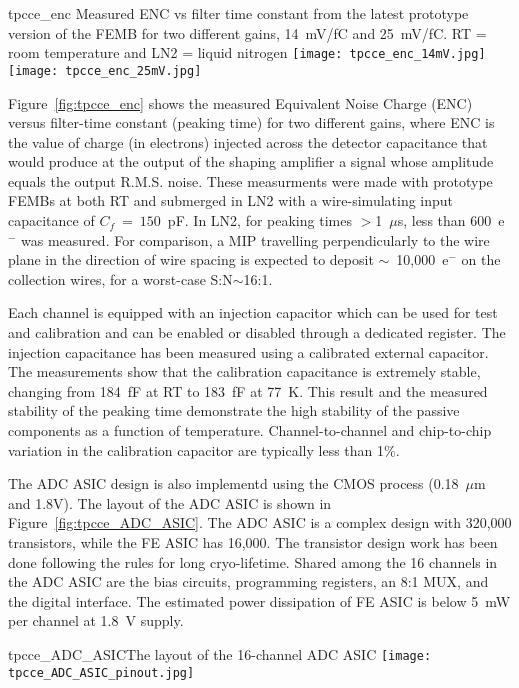 \begin{cdrfigure}{tpcce_enc}{
Measured ENC vs filter time constant from the latest prototype version of the FEMB
for two different gains, 14~mV/fC and 25~mV/fC. RT = room temperature and 
LN2 = liquid nitrogen}
\texttt{[image: tpcce\_enc\_14mV.jpg]}
\texttt{[image: tpcce\_enc\_25mV.jpg]}
\end{cdrfigure}

Figure~\ref{fig:tpcce_enc} shows the measured Equivalent Noise Charge (ENC) versus 
filter-time constant (peaking time) for two different gains, where ENC is the value of charge 
(in electrons) injected across the detector capacitance that would produce at the output of the 
shaping amplifier a signal whose amplitude equals the output R.M.S. noise. These measurments
were made with prototype FEMBs at both RT and submerged in LN2 with a wire-simulating input capacitance of $C_f~=~150$~pF.
In LN2, for peaking times $>$1~$\mu$s, less than 600~e$^{-}$ was measured. For comparison,
a MIP travelling perpendicularly to the wire plane in the direction of wire spacing is
expected to deposit $\sim$~10,000~e$^{-}$ on the collection wires, for a worst-case
S:N$\sim$16:1.

Each channel is equipped with an injection capacitor which can be used
for test and calibration and can be enabled or disabled through a
dedicated register. The injection capacitance has been measured using 
a calibrated external capacitor. The measurements show
that the calibration capacitance is extremely stable, changing from
184~fF at RT to 183~fF at 77~K. This result and the measured
stability of the peaking time demonstrate the high stability of the
passive components as a function of temperature. Channel-to-channel and chip-to-chip
variation in the calibration capacitor are typically less than 1\%. 

The ADC ASIC design is also implementd using the CMOS process (0.18~$\mu$m and 1.8V).
The layout of the ADC ASIC is shown in Figure~\ref{fig:tpcce_ADC_ASIC}. 
The ADC ASIC is a complex design with 320,000 transistors, while the FE ASIC has 16,000.
The transistor design work has been done following the rules for long cryo-lifetime.
Shared among the 16 channels in the ADC ASIC are the bias circuits, programming registers,
an 8:1 MUX, and the digital interface.
The estimated power dissipation of FE ASIC is below 5~mW per channel at 1.8~V supply.
  

\begin{cdrfigure}{tpcce_ADC_ASIC}{The layout of the 16-channel ADC ASIC}
\texttt{[image: tpcce\_ADC\_ASIC\_pinout.jpg]} %
\end{cdrfigure}

